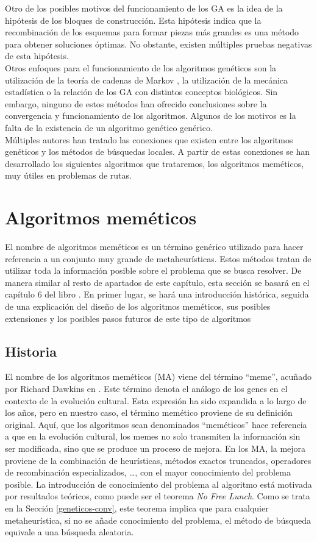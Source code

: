 Otro de los posibles motivos del funcionamiento de los GA es la idea de la hipótesis de los bloques de construcción. Esta hipótesis indica que la recombinación de los esquemas para formar piezas más grandes es una método para obtener soluciones óptimas. No obstante, existen múltiples pruebas negativas de esta hipótesis.\\

Otros enfoques para el funcionamiento de los algoritmos genéticos son la utilización de la teoría de cadenas de Markov \cite{Vose1995ModelingSG}, la utilización de la mecánica estadística \cite{Shapiro1994ASM} o la relación de los GA con distintos conceptos biológicos. Sin embargo, ninguno de estos métodos han ofrecido conclusiones sobre la convergencia y funcionamiento de los algoritmos. Algunos de los motivos es la falta de la existencia de un algoritmo genético genérico.\\

Múltiples autores han tratado las conexiones que existen entre los algoritmos genéticos y los métodos de búsquedas locales. A partir de estas conexiones se han desarrollado los siguientes algoritmos que trataremos, los algoritmos meméticos, muy útiles en problemas de rutas.
\section{Algoritmos meméticos}
El nombre de algoritmos meméticos es un término genérico utilizado para hacer referencia a un conjunto muy grande de metaheurísticas. Estos métodos tratan de utilizar toda la información posible sobre el problema que se busca resolver. De manera similar al resto de apartados de este capítulo, esta sección se basará en el capítulo 6 del libro \cite{metah-hb}. En primer lugar, se hará una introducción histórica, seguida de una explicación del diseño de los algoritmos meméticos, sus posibles extensiones y los posibles pasos futuros de este tipo de algoritmos

\subsection{Historia}
El nombre de los algoritmos meméticos (MA) viene del término ``meme'', acuñado por Richard Dawkins en \cite{dawkins-1989}. Este término denota el análogo de los genes en el contexto de la evolución cultural. Esta expresión ha sido expandida a lo largo de los años, pero en nuestro caso, el término memético proviene de su definición original. Aquí, que los algoritmos sean denominados ``meméticos'' hace referencia a que en la evolución cultural, los memes no solo transmiten la información sin ser modificada, sino que se produce un proceso de mejora. En los MA, la mejora proviene de la combinación de heurísticas, métodos exactos truncados, operadores de recombinación especializados, \ldots, con el mayor conocimiento del problema posible. La introducción de conocimiento del problema al algoritmo está motivada por resultados teóricos, como puede ser el teorema \textit{No Free Lunch}. Como se trata en la Sección \ref{geneticos-conv}, este teorema implica que para cualquier metaheurística, si no se añade conocimiento del problema, el método de búsqueda equivale a una búsqueda aleatoria.\\

